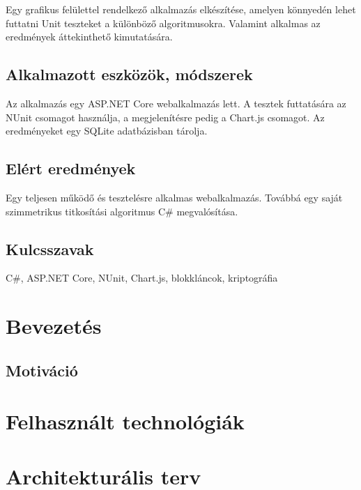 \documentclass[12pt]{report} %
\begin{document}
Egy grafikus felülettel rendelkező alkalmazás elkészítése, amelyen könnyedén lehet futtatni Unit teszteket a különböző algoritmusokra. Valamint alkalmas az eredmények áttekinthető kimutatására.

\section*{Alkalmazott eszközök, módszerek} %

Az alkalmazás egy ASP.NET Core webalkalmazás lett. A tesztek futtatására az NUnit csomagot használja, a megjelenítésre pedig a Chart.js csomagot. Az eredményeket egy SQLite adatbázisban tárolja.

\section*{Elért eredmények} %

Egy teljesen működő és tesztelésre alkalmas webalkalmazás. Továbbá egy saját szimmetrikus titkosítási algoritmus C\# megvalósítása.

\section*{Kulcsszavak} %

C\#, ASP.NET Core, NUnit, Chart.js, blokkláncok, kriptográfia

\chapter{Bevezetés} %

\section{Motiváció} %

\chapter{Felhasznált technológiák} %

\chapter{Architekturális terv} %
\end{document}

